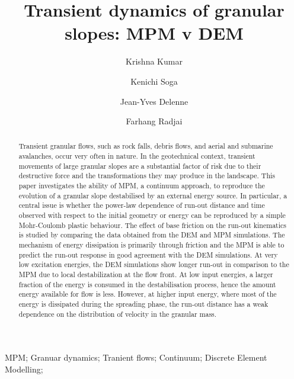 \documentclass[3p,times,procedia,number]{elsarticle}
\begin{document}
\begin{frontmatter}



\title{Transient dynamics of granular slopes: MPM v DEM}

\author[a]{Krishna Kumar}
\author[a,b]{Kenichi Soga}
\author[c]{Jean-Yves Delenne}
\author[c,d]{Farhang Radjai}

\address[a]{Department of Engineering, University of Cambridge, Cambridge CB2
  1PZ, UK}
\address[b]{Department of Civil Engineering, University of California,
  Berkeley, USA}
\address[c]{University of Montpellier II, France}
\address[d]{Massachusetts Institute of Technology, Cambridge, USA}

\begin{abstract}
Transient granular flows, such as rock falls, debris flows, and aerial and
submarine avalanches, occur very often in nature. In the geotechnical
context, transient movements of large granular slopes are a substantial
factor of risk due to their destructive force and the transformations they
may produce in the landscape. This paper investigates the ability of MPM, a
continuum approach, to reproduce the evolution of a granular slope
destabilised by an external energy source. In particular, a central issue is
whether the power-law dependence of run-out distance and time observed with
respect to the initial geometry or energy can be reproduced by a simple
Mohr-Coulomb plastic behaviour. The effect of base 
friction on the run-out kinematics is studied by comparing the data obtained
from the DEM and MPM simulations. The mechanism of energy dissipation is
primarily through friction and the MPM is able to predict the run-out response in
good agreement with the DEM simulations. At very low excitation energies, 
the DEM simulations show longer run-out in comparison to the MPM due to local
destabilization at the flow front. At low input energies, a larger fraction of
the energy is consumed in the destabilisation process, hence the amount energy
available for flow is less. However, at higher input energy, where most of
the energy is dissipated during the spreading phase, the run-out distance 
has a weak dependence on the distribution of velocity in the granular mass.
\end{abstract}

\begin{keyword}
MPM; Granuar dynamics; Tranient flows; Continuum; 
Discrete Element Modelling;



\end{keyword}
\end{frontmatter}
\end{document}
